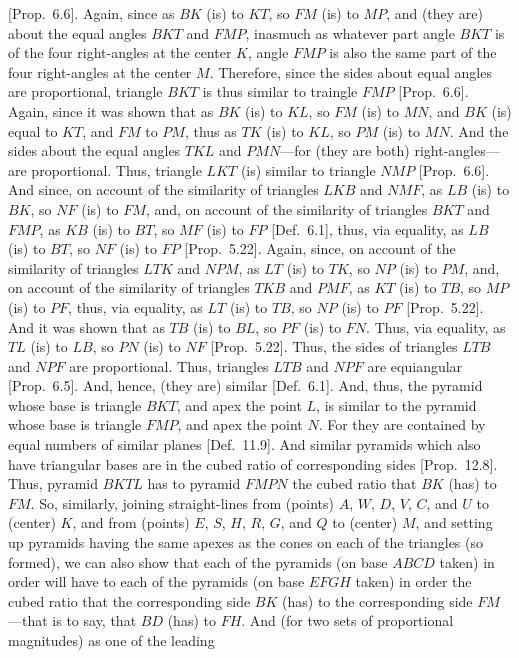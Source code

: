 \begin{Parallel}{}{}
{[Prop.~6.6]. Again, since as $BK$ (is) to $KT$, so
$FM$ (is) to $MP$, and (they are) about the equal angles $BKT$ and $FMP$, inasmuch as whatever part angle $BKT$
is of the four right-angles at the center $K$, angle $FMP$ is also the same part of the four right-angles at the  center $M$. 
Therefore, since the sides about equal angles are proportional,  triangle $BKT$ is thus similar to traingle $FMP$ [Prop.~6.6].
Again, since it was shown that as $BK$ (is) to $KL$, so $FM$ (is) to $MN$, and $BK$ (is) equal to $KT$, and
$FM$ to $PM$, thus as $TK$ (is) to $KL$, so $PM$ (is) to $MN$. And the sides about the equal angles
$TKL$ and $PMN$---for (they are both) right-angles---are proportional.  Thus, triangle $LKT$ (is) similar to
triangle $NMP$ [Prop.~6.6]. And since, on account of the similarity of triangles $LKB$ and
$NMF$, as $LB$ (is) to $BK$, so $NF$ (is) to $FM$, and, on account of the  similarity of triangles $BKT$ and
$FMP$, as $KB$ (is) to $BT$, so $MF$ (is) to $FP$ [Def.~6.1], thus, via equality, as $LB$ (is)
to $BT$, so $NF$ (is) to $FP$ [Prop.~5.22]. Again, since, on account of the similarity of
triangles $LTK$ and $NPM$, as $LT$ (is) to $TK$, so $NP$ (is) to $PM$, and, on account of the similarity of
triangles $TKB$ and $PMF$, as $KT$ (is) to $TB$, so $MP$ (is) to $PF$, thus, via equality,  as $LT$ (is) to $TB$, so
$NP$ (is) to $PF$ [Prop.~5.22]. And it was shown that as $TB$ (is) to $BL$, so $PF$ (is) to $FN$.
 Thus, via equality, as $TL$ (is) to $LB$, so $PN$ (is) to $NF$ [Prop.~5.22]. Thus, the sides of triangles
 $LTB$ and $NPF$ are proportional. Thus, triangles $LTB$ and $NPF$ are equiangular [Prop.~6.5]. 
 And, hence, (they are) similar [Def.~6.1]. And, thus, the pyramid whose base is triangle $BKT$, and
 apex the point $L$, is similar to the pyramid whose base is triangle $FMP$, and apex the point $N$. For they are contained
 by equal numbers of similar planes [Def.~11.9]. And similar pyramids which also have triangular
 bases are in the cubed ratio of corresponding sides [Prop.~12.8]. Thus, pyramid
 $BKTL$ has to pyramid $FMPN$ the cubed ratio that $BK$ (has) to $FM$. So, similarly, joining
 straight-lines from (points) $A$, $W$, $D$, $V$, $C$, and $U$ to (center) $K$, and from (points) $E$, $S$, $H$, $R$,
 $G$,  and $Q$ to (center) $M$, and setting up pyramids having the same apexes as the cones on each of the triangles (so formed), we can also show
 that each of the pyramids (on base $ABCD$ taken) in order will have to each of the pyramids (on base $EFGH$ taken) in order the cubed ratio that the corresponding side
 $BK$ (has) to the corresponding side $FM$---that is to say, that $BD$ (has) to $FH$. And (for two sets of proportional magnitudes) as one of the leading
}
\end{Parallel}
